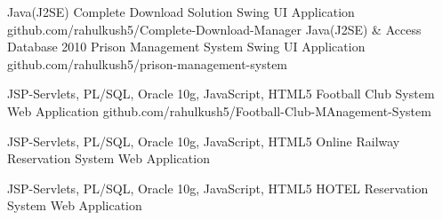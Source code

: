 

\begin{cventries}

  \cventry
    {Java(J2SE) } %
    {Complete Download Solution} %
    {Swing UI Application} %
    {github.com/rahulkush5/Complete-Download-Manager} %
    {    }
  \cventry
    {Java(J2SE) \& Access Database 2010} %
    {Prison Management System} %
    {Swing UI Application} %
    {github.com/rahulkush5/prison-management-system} %
    {    }
    
  \cventry
    {JSP-Servlets, PL/SQL, Oracle 10g, JavaScript, HTML5} %
    {Football Club  System} %
    {Web Application} %
    {github.com/rahulkush5/Football-Club-MAnagement-System} %
    {  }

  \cventry
    {JSP-Servlets, PL/SQL, Oracle 10g, JavaScript, HTML5} %
    {Online Railway Reservation System} %
    {Web Application} %
    {} %
    {  }

  \cventry
    {JSP-Servlets, PL/SQL, Oracle 10g, JavaScript, HTML5} %
    {HOTEL Reservation System} %
    {Web Application} %
    {} %
    {  }



\end{cventries}



